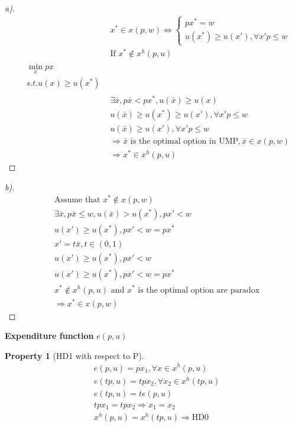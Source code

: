 \documentclass{article}
\newtheorem{property}{Property}
\begin{document}
\begin{proof}[a)]
\begin{align}
& x^{*}\in x(p,w) \iff \begin{cases}
px^{*}=w \\
u(x^{*})\ge u(x'), \forall x'p \le w\end{cases}
\\&\text{If } x^{*}\notin x^{h}(p,u)
\\\begin{split}
&\min\limits_{x} px
\\&s.t. u(x)\ge u(x^{*})
\end{split}
\\&\exists \bar{x}, p\bar{x}<p x^{*}, u(\bar{x})\ge u(x)
\\&u(\bar{x}) \ge u(x^{*})\ge u(x'),\forall x'p\le w
\\&u(\bar{x})\ge u(x'),\forall x'p\le w
\\&\Rightarrow \bar{x} \text{ is the optimal option in UMP},\bar{x} \in x(p,w)
\\& \Rightarrow x^{*} \in x^{h}(p,u)
\end{align}
\end{proof}

\begin{proof}[b)]
\begin{align}
& \text{Assume that }x^{*} \notin x(p,w)
\\&\exists \bar{x},p\bar{x}\le w, u(\bar{x})>u(x^{*}),px'<w
\\&u(x')\ge u(x^{*}),px'<w=px^{*}
\\&x'=t\bar{x}, t\in (0,1)
\\&u(x')\ge u(x^{*}), px'<w
\\&u(x')\ge u(x^{*}),px'<w=px^{*}
\\&x^{*} \notin x^{h}(p,u) \text{ and } x^{*} \text{ is the optimal option are paradox}
\\&\Rightarrow x^{*} \in x(p,w)
\end{align}
\end{proof}

\textbf{Expenditure function} $e(p,u)$ 

\begin{property}[HD1 with respect to P]
\begin{align}
&e(p,u)=px_{1},\forall x \in x^{h}(p,u)
\\&e(tp,u)=tpx_{2},\forall x_{2}\in x^{h}(tp,u)
\\&e(tp,u)=t e(p,u)
\\&tpx_{1}=tpx_{2} \Rightarrow x_{1}=x_{2}
\\&x^{h}(p,u)=x^{h}(tp,u) \Rightarrow \text{HD}0
\end{align}
\end{property}
\end{document}
